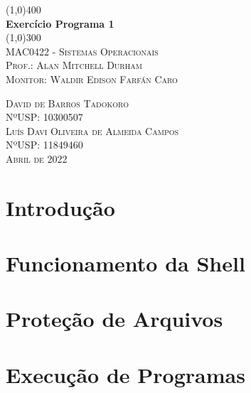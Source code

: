 \documentclass[a4paper, 12pt]{article}
\begin{document}
\begin{titlepage}
	\begin{center}
		\line(1,0){400} \\
		[0.25in]
		\huge{\bfseries Exercício Programa 1} \\
		[0.01in]
		\line(1,0){300} \\
		[0.5cm]
		\textsc{\Large MAC0422 - Sistemas Operacionais} \\
		[1.5cm]
		\textsc{\large Prof.: Alan Mitchell Durham}\\
		\textsc{\large Monitor: Waldir Edison Farfán Caro}\\
		[12cm]
	\end{center}
	\begin{flushright}
		\textsc{David de Barros Tadokoro}\\
		\textsc{NºUSP: 10300507}\\
		\textsc{Luís Davi Oliveira de Almeida Campos}\\
		\textsc{NºUSP: 11849460}\\
		\textsc{Abril de 2022}
	\end{flushright}
\end{titlepage}

\newpage

\section{Introdução}

\section{Funcionamento da Shell}

\section{Proteção de Arquivos}

\section{Execução de Programas}
\end{document}
